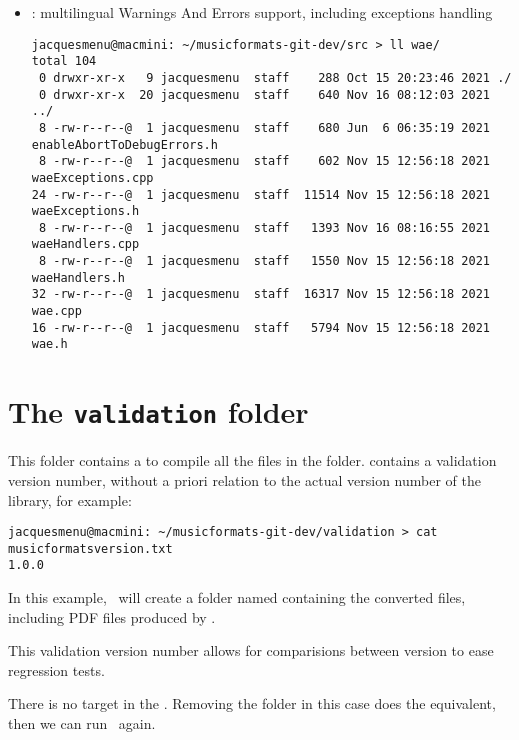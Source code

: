 \begin{itemize}
\item {} : multilingual Warnings And Errors support, including exceptions handling
\begin{lstlisting}[language=Terminal]
jacquesmenu@macmini: ~/musicformats-git-dev/src > ll wae/
total 104
 0 drwxr-xr-x   9 jacquesmenu  staff    288 Oct 15 20:23:46 2021 ./
 0 drwxr-xr-x  20 jacquesmenu  staff    640 Nov 16 08:12:03 2021 ../
 8 -rw-r--r--@  1 jacquesmenu  staff    680 Jun  6 06:35:19 2021 enableAbortToDebugErrors.h
 8 -rw-r--r--@  1 jacquesmenu  staff    602 Nov 15 12:56:18 2021 waeExceptions.cpp
24 -rw-r--r--@  1 jacquesmenu  staff  11514 Nov 15 12:56:18 2021 waeExceptions.h
 8 -rw-r--r--@  1 jacquesmenu  staff   1393 Nov 16 08:16:55 2021 waeHandlers.cpp
 8 -rw-r--r--@  1 jacquesmenu  staff   1550 Nov 15 12:56:18 2021 waeHandlers.h
32 -rw-r--r--@  1 jacquesmenu  staff  16317 Nov 15 12:56:18 2021 wae.cpp
16 -rw-r--r--@  1 jacquesmenu  staff   5794 Nov 15 12:56:18 2021 wae.h
\end{lstlisting}

\end{itemize}


\section{The {\tt validation} folder}

This folder contains a  to compile all the files in the  folder.
 contains a validation version number, without a priori relation to the actual version number of the library, for example:
\begin{lstlisting}[language=Terminal]
jacquesmenu@macmini: ~/musicformats-git-dev/validation > cat musicformatsversion.txt
1.0.0
\end{lstlisting}

In this example, \make\ will create a folder named  containing the converted files, including PDF files produced by .

This validation version number allows for comparisions between version to ease regression tests.

There is no  target in the . Removing the  folder in this case does the equivalent, then we can run \make\ again.




